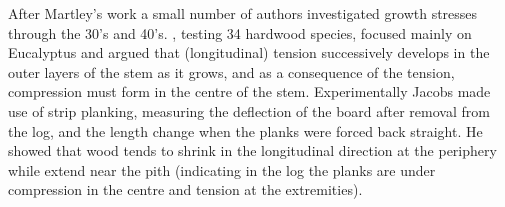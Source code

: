 After Martley's work a small number of authors investigated growth stresses
through the 30's and 40's. \cite{jacobs1945l}, testing 34 hardwood species, focused
mainly on Eucalyptus and argued that (longitudinal) tension successively
develops in the outer layers of the stem as it grows, and as a consequence of
the tension, compression must form in the centre of the stem. 
Experimentally Jacobs made use of strip planking, measuring the deflection of
the board after removal from the log, and the length change when the planks were
forced back straight. He showed that wood tends to shrink in the longitudinal
direction at the periphery while extend near the pith (indicating in the log
the planks are under compression in the centre and tension at the extremities).